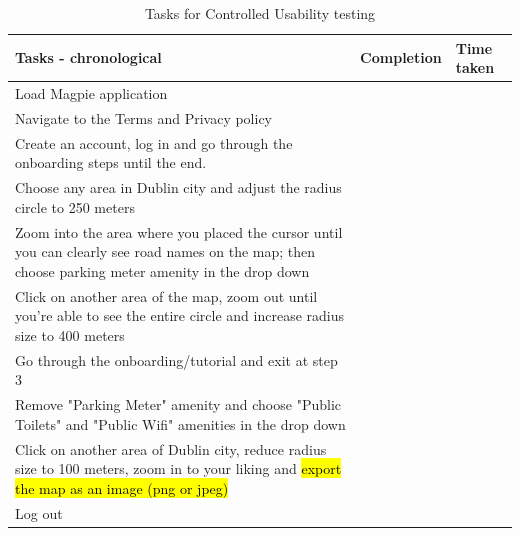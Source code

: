 \documentclass{report}
\begin{document}
\begin{table}[h!]
    \centering
    \caption{Tasks for Controlled Usability testing}
    \label{tab:table2}
    \begin{tabularx}{\textwidth}{|p{}|X|X|}
        \hline
        \textbf{Tasks - chronological}                                                                                                                     & \textbf{Completion} & \textbf{Time taken} \\ \hline
        Load Magpie application                                                                                                                            &                     &                     \\ \hline
        Navigate to the Terms and Privacy policy                                                                                                           &                     &                     \\ \hline
        Create an account, log in and go through the onboarding steps until the end.                                                                       &                     &                     \\ \hline
        Choose any area in Dublin city and adjust the radius circle to 250 meters                                                                          &                     &                     \\ \hline
        Zoom into the area where you placed the cursor until you can clearly see road names on the map; then choose parking meter amenity in the drop down &                     &                     \\ \hline
        Click on another area of the map, zoom out until you're able to see the entire circle and increase radius size to 400 meters                       &                     &                     \\ \hline
        Go through the onboarding/tutorial and exit at step 3                                                                                              &                     &                     \\ \hline
        Remove "Parking Meter" amenity and choose "Public Toilets" and "Public Wifi" amenities in the drop down                                            &                     &                     \\ \hline
        Click on another area of Dublin city, reduce radius size to 100 meters, zoom in to your liking and \hl{export the map as an image (png or jpeg)}   &                     &                     \\ \hline
        Log out                                                                                                                                            &                     &                     \\ \hline
    \end{tabularx}
\end{table}
\end{document}

